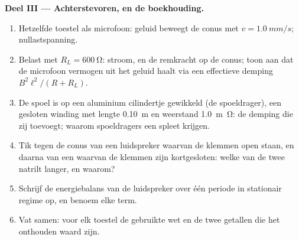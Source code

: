 \begin{problem}
\medskip
\noindent\textbf{Deel III --- Achterstevoren, en de boekhouding.}
\begin{enumerate}[resume]
  \item Hetzelfde toestel als microfoon: geluid beweegt de conus met
        $v = \qty{1.0}{mm/s}$; nullastspanning.
  \item Belast met $R_L = \qty{600}{\ohm}$: stroom, en de remkracht
        op de conus; toon aan dat de microfoon vermogen uit het geluid haalt
        via een effectieve demping $B^2\ell^2/(R + R_L)$.
  \item De spoel is op een aluminium cilindertje gewikkeld (de spoeldrager), een
        gesloten winding met lengte \qty{0.10}{m} en weerstand \qty{1.0}{m\ohm}:
        de demping die zij toevoegt; waarom spoeldragers een spleet krijgen.
  \item Tik tegen de conus van een luidspreker waarvan de klemmen open staan, en
        daarna van een waarvan de klemmen zijn kortgesloten: welke van de twee natrilt langer,
        en waarom?
  \item Schrijf de energiebalans van de luidspreker over één periode in
        stationair regime op, en benoem elke term.
  \item Vat samen: voor elk toestel de gebruikte wet en de twee getallen
        die het onthouden waard zijn.
\end{enumerate}
\end{problem}
